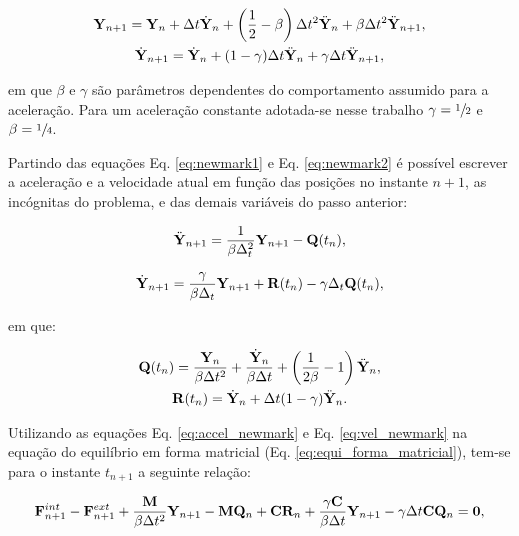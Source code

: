 \documentclass[tese_patricia]{subfiles}
\begin{document}
\begin{gather}
	\mathbf{Y}_{n+1}=\mathbf{Y}_{n} + \Delta t \dot{\mathbf{Y}}_{n}+\left(\frac{1}{2}-\beta\right) \Delta t^2 \ddot{\mathbf{Y}}_{n}+ \beta \Delta t^2 \ddot{\mathbf{Y}}_{n+1},\label{eq:newmark1}\\
	\dot{\mathbf{Y}}_{n+1} = \dot{\mathbf{Y}}_{n}+(1-\gamma)\Delta t \ddot{\mathbf{Y}}_{n}+\gamma \Delta t \ddot{\mathbf{Y}}_{n+1},\label{eq:newmark2}
\end{gather}

\noindent em que $\beta$ e $\gamma$ são parâmetros dependentes do comportamento assumido para a aceleração. Para um aceleração constante adotada-se nesse trabalho $\gamma=\sfrac{1}{2}$ e $\beta=\sfrac{1}{4}$.

Partindo das equações Eq. \ref{eq:newmark1} e Eq. \ref{eq:newmark2} é possível escrever a aceleração e a velocidade atual em função das posições no instante $n+1$, as incógnitas do problema, e das demais variáveis do passo anterior:

\begin{align}
	\ddot{\mathbf{Y}}_{n+1} = \frac{1}{\beta \Delta_{t}^2}\mathbf{Y}_{n+1} - \mathbf{Q}(t_n), \label{eq:accel_newmark}
\end{align}

\begin{align}
	\dot{\mathbf{Y}}_{n+1} = \frac{\gamma}{\beta \Delta_{t}}\mathbf{Y}_{n+1} + \mathbf{R}(t_n) - \gamma \Delta_{t} \mathbf{Q}(t_n), \label{eq:vel_newmark}
\end{align}

\noindent em que:

\begin{gather}
	\mathbf{Q}(t_n) = \frac{\mathbf{Y}_n}{\beta \Delta t^2} + \frac{\dot{\mathbf{Y}}_n}{\beta \Delta t} + \left(\frac{1}{2\beta} -1 \right)\ddot{\mathbf{Y}}_n,\label{eq:Qn}\\
	\mathbf{R}(t_n) = \dot{\mathbf{Y}}_n+\Delta t(1-\gamma)\ddot{\mathbf{Y}}_n.\label{eq:Rn}
\end{gather}

Utilizando as equações Eq. \ref{eq:accel_newmark} e Eq. \ref{eq:vel_newmark} na equação do equilíbrio em forma matricial (Eq. \ref{eq:equi_forma_matricial}), tem-se para o instante $t_{n+1}$ a seguinte relação:

\begin{gather}
	\mathbf{F}^{int}_{n+1}- \mathbf{F}^{ext}_{n+1} + \frac{\mathbf{M}}{\beta \Delta t^2} \mathbf{Y}_{n+1}-\mathbf{M} \mathbf{Q}_n+ \mathbf{C}\mathbf{R}_n + \frac{\gamma \mathbf{C}}{\beta \Delta t}\mathbf{Y}_{n+1} - \gamma\Delta t \mathbf{C}\mathbf{Q}_n = \mathbf{0},
	\label{eq:equilibrio_tn+1}
\end{gather}
  
\end{document}
